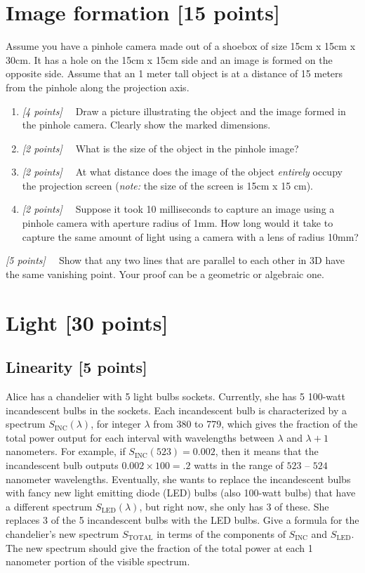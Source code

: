 \documentclass[10pt,letterpaper]{article}
\newcommand{\points}[1]{{\color{mygreen}\emph{[#1]\ \ }}}
\begin{document}
\section{Image formation [15 points]}
Assume you have a pinhole camera made out of a shoebox of size 15cm x 15cm x
30cm.
It has a hole on the 15cm x 15cm side and an image is formed on the
opposite side.
Assume that an 1 meter tall object is at a distance of 15 meters from
the pinhole along the projection axis.
\begin{enumerate}
\item \points{4 points} Draw a picture illustrating the object and the image formed in the pinhole camera. Clearly show the marked dimensions.
\item \points{2 points} What is the size of the object in the pinhole image?
\item \points{2 points} At what distance does the image of the object \emph{entirely} occupy the projection screen (\emph{note:} the size of the screen is 15cm x 15 cm).
\item \points{2 points} Suppose it took 10 milliseconds to capture an
  image using a pinhole camera with aperture radius of 1mm. How long
  would it take to capture the same amount of light using a camera
  with a lens of radius 10mm?
\end{enumerate}

\noindent
\points{5 points} Show that any two lines that are parallel to each
  other in 3D have the same vanishing point. Your proof can be a
  geometric or algebraic one.

\section{Light [30 points]}
\subsection{Linearity [5 points]}
Alice has a chandelier with 5 light
bulbs sockets. Currently, she has 5 100-watt incandescent bulbs in the sockets.
Each incandescent bulb is characterized by a spectrum $S_{\text{INC}}(\lambda)$, for integer $\lambda$
from 380 to 779, which gives the fraction of the total power output for each
interval with wavelengths between $\lambda$ and $\lambda + 1$ nanometers. For example, if
$S_{\text{INC}}(523) = 0.002$, then it means that the incandescent bulb outputs $0.002 \times
100 = .2$ watts in the range of $523$ -- $524$ nanometer wavelengths.
Eventually, she wants to replace the incandescent bulbs with fancy new
light emitting diode (LED) bulbs (also 100-watt bulbs) that have a different
spectrum $S_{\text{LED}}(\lambda)$, but right now, she only has 3 of these. She replaces 3 of the 5
incandescent bulbs with the LED bulbs. Give a formula for the chandelier’s new
spectrum $S_{\text{TOTAL}}$ in terms of the components of $S_{\text{INC}}$ and $S_{\text{LED}}$. The new spectrum
should give the fraction of the total power at each 1 nanometer portion of the
visible spectrum.
\end{document}

